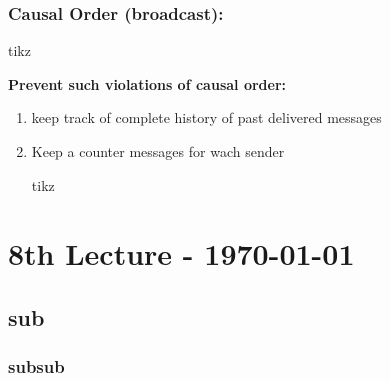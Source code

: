 \documentclass{article}
\begin{document}
\begin{adjustwidth}{2em}{2em}
\begin{adjustwidth}{2em}{2em}
			\subsubsection{Causal Order (broadcast):}
			\begin{center}
				tikz
			\end{center}
			\begin{adjustwidth}{2em}{}
				\textbf{Prevent such violations of causal order:}
				\begin{enumerate}[-]
					\item keep track of complete history of past delivered messages
					\item Keep a counter messages for wach sender \\
					\begin{center}
						tikz
					\end{center}
				\end{enumerate}
			\end{adjustwidth}
		\end{adjustwidth}
	\end{adjustwidth}
	
	\newpage
	
	\section{8th Lecture - \today}
	\begin{adjustwidth}{2em}{2em}
		\subsection{sub}
		\begin{adjustwidth}{2em}{2em}
			\subsubsection{subsub}
			\begin{adjustwidth}{2em}{}
			\end{adjustwidth}
		\end{adjustwidth}
	\end{adjustwidth}
\end{document}
